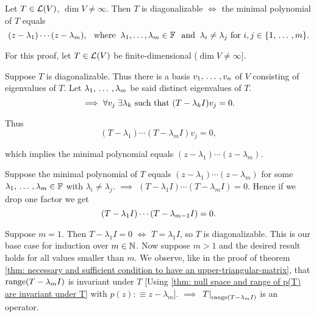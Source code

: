 \setcounter{thm}{61}
\begin{thm}
  \label{thm: necessary and sufficient condition for diagonalizability}
  Let $T\in \mathcal{L} (V)$, $\dim V \neq \infty$. Then $T$ is diagonalizable $\iff$ the minimal polynomial of $T$ equals
  \begin{equation}
    (z-\lambda_1) \cdots (z-\lambda_m), \where \lambda_1, \dots, \lambda_m \in \myF \myand \lambda_i \neq  \lambda_j $ for $ i,j \in \{1, \ddd, m \}.
  \end{equation}
\end{thm}
\begin{prf} For this proof, let $T\in \mathcal{L} (V)$ be finite-dimensional ($\dim V \neq \infty$].

  \Rightarrowdirection Suppose $T$ is diagonalizable. Thus there is a basis $v_1, {\, \ldots \,\,}, v_n$ of $V$ consisting of eigenvalues of $T$.  Let $\lambda_1, {\, \ldots \,\,}, \lambda_m$ be said distinct eigenvalues of $T$. %
  \begin{equation}
    \implies \forall v_j \; \exists \lambda_k $ \st $ (T-\lambda_k I)v_j = 0.
  \end{equation}

  Thus
  \begin{equation}
    (T-\lambda_1) \cdots (T-\lambda_m I)v_j =0,
  \end{equation}

  which implies the minimal polynomial equals $(z-\lambda_1)\cdots(z-\lambda_m).$

  \Leftarrowdirection Suppose the minimal polynomial of $T$ equals $(z-\lambda_1) \cdots (z-\lambda_m)$ for some $\lambda_1, {\, \ldots \,\,}, \lambda_m \in  \mathbb{F}$ with $\lambda_i \neq \lambda_j$.
  $\implies$ $(T-\lambda_1 I) \cdots (T-\lambda_m I)=0.$ Hence if we drop one factor we get
  \begin{equation}
    \label{eq: (t-l1 I)***(t-l_{m-1}I)=0}
    (T-\lambda_1 I) \cdots (T-\lambda_{m-1} I)=0.
  \end{equation}

  Suppose $m=1$. Then $T-\lambda_1 I = 0$ $\iff$ $T=\lambda_1 I$, so $T$ is diagonalizable. This is our base case for induction over $m \in \mathbb{N}$.
  Now suppose $m>1$ and the desired result holds for all values smaller than $m$. We observe, like in the proof of theorem \ref{thm: necessary and sufficient condition to have an upper-triangular-matrix}, that $\operatorname{range} (T-\lambda_m I)$ is invariant under $T$ [Using \ref{thm: null space and range of p(T) are invariant under T} with $p(z) :\equiv z-\lambda_m$]. $\implies$ $\left . T \right |_{\operatorname{range}(T-\lambda_m I)}$ is an operator.


\end{prf}
